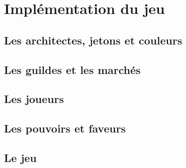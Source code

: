 
\section{Implémentation du jeu}


\subsection{Les architectes, jetons et couleurs}






\subsection{Les guildes et les marchés}





\subsection{Les joueurs}




\subsection{Les pouvoirs et faveurs}





\subsection{Le jeu}


